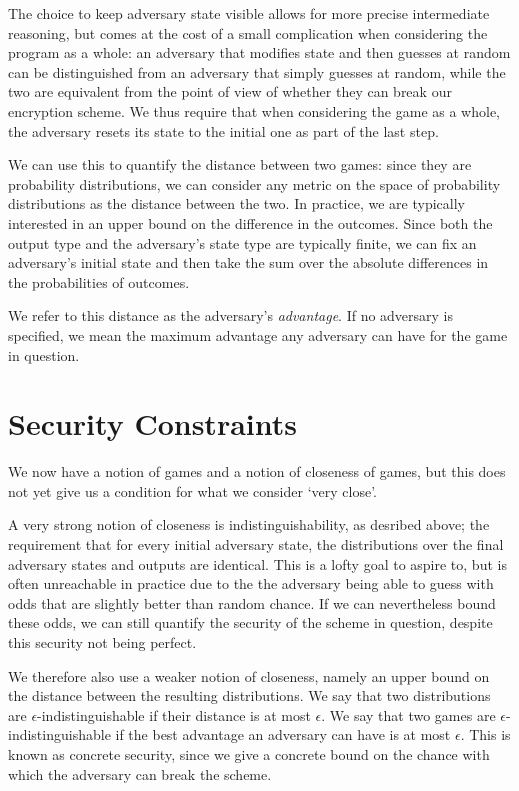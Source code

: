 The choice to keep adversary state visible allows for more precise intermediate reasoning, but comes at the cost of a
small complication when considering the program as a whole: an adversary that modifies state and then guesses at random
can be distinguished from an adversary that simply guesses at random, while the two are equivalent from the point of
view of whether they can break our encryption scheme.  We thus require that when considering the game as a whole, the
adversary resets its state to the initial one as part of the last step.

We can use this to quantify the distance between two games: since they are probability distributions, we can consider
any metric on the space of probability distributions as the distance between the two.  In practice, we are typically
interested in an upper bound on the difference in the outcomes.  Since both the output type and the adversary's state
type are typically finite, we can fix an adversary's initial state and then take the sum over the absolute differences
in the probabilities of outcomes.

We refer to this distance as the adversary's \emph{advantage}.  If no adversary is specified, we mean the maximum
advantage any adversary can have for the game in question.

\section{Security Constraints}

We now have a notion of games and a notion of closeness of games, but this does not yet give us a condition for what we
consider `very close'.

A very strong notion of closeness is indistinguishability, as desribed above; the requirement that for every initial
adversary state, the distributions over the final adversary states and outputs are identical.  This is a lofty goal to
aspire to, but is often unreachable in practice due to the the adversary being able to guess with odds that are
slightly better than random chance.  If we can nevertheless bound these odds, we can still quantify the security of the
scheme in question, despite this security not being perfect.

We therefore also use a weaker notion of closeness, namely an upper bound on the distance between the resulting
distributions.  We say that two distributions are $\epsilon$-indistinguishable if their distance is at most $\epsilon$.
We say that two games are $\epsilon$-indistinguishable if the best advantage an adversary can have is at most
$\epsilon$.  This is known as concrete security, since we give a concrete bound on the chance with which the adversary
can break the scheme.

